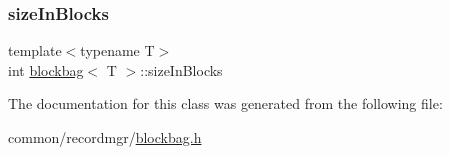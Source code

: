 \subsubsection{\texorpdfstring{size\+In\+Blocks}{sizeInBlocks}}
{\footnotesize\ttfamily template$<$typename T$>$ \\
int \hyperlink{classblockbag}{blockbag}$<$ T $>$\+::size\+In\+Blocks}



The documentation for this class was generated from the following file\+:\begin{DoxyCompactItemize}
\item 
common/recordmgr/\hyperlink{blockbag_8h}{blockbag.\+h}\end{DoxyCompactItemize}
